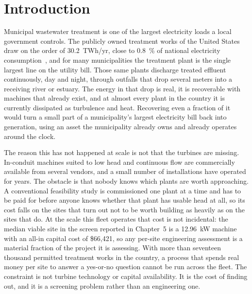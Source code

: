 \documentclass[12pt,letterpaper]{report}
\begin{document}
\begin{singlespace}
\clearpage
\tableofcontents
\clearpage
{}
\listoffigures
\clearpage
{}
\listoftables
\end{singlespace}
\clearpage


\chapter{Introduction}

Municipal wastewater treatment is one of the largest electricity loads a local
government controls. The publicly owned treatment works of the United States draw
on the order of 30.2~TWh/yr, close to 0.8~\% of national electricity
consumption~\cite{epri2013}, and for many municipalities the treatment plant is
the single largest line on the utility bill. Those same plants discharge treated
effluent continuously, day and night, through outfalls that drop several meters
into a receiving river or estuary. The energy in that drop is real, it is
recoverable with machines that already exist, and at almost every plant in the
country it is currently dissipated as turbulence and heat. Recovering even a
fraction of it would turn a small part of a municipality's largest electricity
bill back into generation, using an asset the municipality already owns and
already operates around the clock.

The reason this has not happened at scale is not that the turbines are missing.
In-conduit machines suited to low head and continuous flow are commercially
available from several vendors, and a small number of installations have operated
for years. The obstacle is that nobody knows which plants are worth approaching.
A conventional feasibility study is commissioned one plant at a time and has to be
paid for before anyone knows whether that plant has usable head at all, so its
cost falls on the sites that turn out not to be worth building as heavily as on
the sites that do. At the scale this fleet operates that cost is not incidental:
the median viable site in the screen reported in Chapter~5 is a 12.96~kW machine
with an all-in capital cost of \$66{,}421, so any per-site engineering assessment
is a material fraction of the project it is assessing. With more than seventeen
thousand permitted treatment works in the country, a process that spends real
money per site to answer a yes-or-no question cannot be run across the fleet. The
constraint is not turbine technology or capital availability. It is the cost of
finding out, and it is a screening problem rather than an engineering one.
\end{document}
